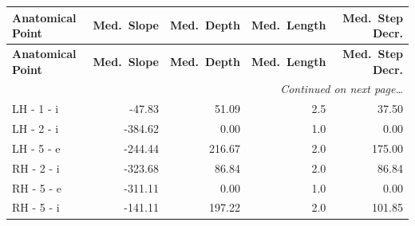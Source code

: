 \documentclass[a4paper,11pt]{article}
\begin{document}
\begin{small}
\begin{longtable}{p{4.5cm}rrrr}
\toprule
\textbf{Anatomical Point} &
\textbf{Med.\ Slope} &
\textbf{Med.\ Depth} &
\textbf{Med.\ Length} &
\textbf{Med.\ Step Decr.} \\
\midrule
\endfirsthead
\toprule
\textbf{Anatomical Point} &
\textbf{Med.\ Slope} &
\textbf{Med.\ Depth} &
\textbf{Med.\ Length} &
\textbf{Med.\ Step Decr.} \\
\midrule
\endhead
\midrule
\multicolumn{5}{r}{\small\emph{Continued on next page\ldots}} \\
\endfoot
\bottomrule
\endlastfoot
LH - 1 - i & -47.83 & 51.09 & 2.5 & 37.50 \\
LH - 2 - i & -384.62 & 0.00 & 1.0 & 0.00 \\
LH - 5 - e & -244.44 & 216.67 & 2.0 & 175.00 \\
RH - 2 - i & -323.68 & 86.84 & 2.0 & 86.84 \\
RH - 5 - e & -311.11 & 0.00 & 1.0 & 0.00 \\
RH - 5 - i & -141.11 & 197.22 & 2.0 & 101.85 \\
\end{longtable}
\end{small}
\end{document}
